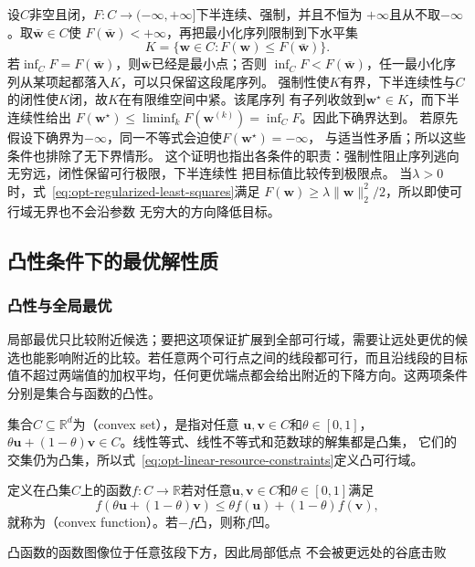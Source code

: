 设$C$非空且闭，$F:C\to(-\infty,+\infty]$下半连续、强制，并且不恒为
$+\infty$且从不取$-\infty$。取$\bar{\bm{w}}\in C$使
$F(\bar{\bm{w}})<+\infty$，再把最小化序列限制到下水平集
\[
  K=\{\bm{w}\in C:F(\bm{w})\leq F(\bar{\bm{w}})\}.
\]
若$\inf_C F=F(\bar{\bm{w}})$，则$\bar{\bm{w}}$已经是最小点；否则
$\inf_C F<F(\bar{\bm{w}})$，任一最小化序列从某项起都落入$K$，可以只保留这段尾序列。
强制性使$K$有界，下半连续性与$C$的闭性使$K$闭，故$K$在有限维空间中紧。该尾序列
有子列收敛到$\bm{w}^{\star}\in K$，而下半连续性给出
$F(\bm{w}^{\star})\leq\liminf_kF(\bm{w}^{(k)})=\inf_C F$。因此下确界达到。
若原先假设下确界为$-\infty$，同一不等式会迫使$F(\bm w^\star)=-\infty$，
与适当性矛盾；所以这些条件也排除了无下界情形。
这个证明也指出各条件的职责：强制性阻止序列逃向无穷远，闭性保留可行极限，下半连续性
把目标值比较传到极限点。
当$\lambda>0$时，式~\eqref{eq:opt-regularized-least-squares}满足
$F(\bm{w})\geq\lambda\lVert\bm{w}\rVert_2^2/2$，所以即使可行域无界也不会沿参数
无穷大的方向降低目标。

\subsection{凸性条件下的最优解性质}
\label{sec:opt-convexity}

\subsubsection{凸性与全局最优}

局部最优只比较附近候选；要把这项保证扩展到全部可行域，需要让远处更优的候选也能影响附近的比较。若任意两个可行点之间的线段都可行，而且沿线段的目标值不超过两端值的加权平均，任何更优端点都会给出附近的下降方向。这两项条件分别是集合与函数的凸性。
\begin{definition}[凸集与凸函数]
\label{def:opt-convex-set-function}
集合$C\subseteq\mathbb R^d$为（convex set），是指对任意
$\bm{u},\bm{v}\in C$和$\theta\in[0,1]$，
$\theta\bm{u}+(1-\theta)\bm{v}\in C$。线性等式、线性不等式和范数球的解集都是凸集，
它们的交集仍为凸集，所以式~\eqref{eq:opt-linear-resource-constraints}定义凸可行域。

定义在凸集$C$上的函数$f:C\to\mathbb R$若对任意$\bm u,\bm v\in C$和$\theta\in[0,1]$满足
\begin{equation}
  f(\theta\bm{u}+(1-\theta)\bm{v})
  \leq
  \theta f(\bm{u})+(1-\theta)f(\bm{v}),
  \label{eq:opt-convex-function}
\end{equation}
就称为（convex function）。若$-f$凸，则称$f$凹。
\end{definition}
凸函数的函数图像位于任意弦段下方，因此局部低点
不会被更远处的谷底击败

